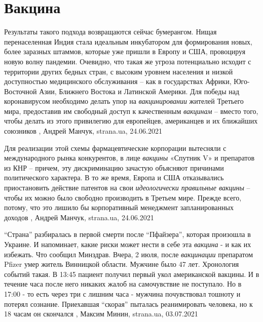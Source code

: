  
 
 
 
 
\chapter{Вакцина}
\label{sec:slova.vaccina}

Результаты такого подхода возвращаются сейчас бумерангом. Нищая перенаселенная
Индия стала идеальным инкубатором для формирования новых, более заразных
штаммов, которые уже пришли в Европу и США, провоцируя новую волну пандемии.
Очевидно, что такая же угроза потенциально исходит с территории других бедных
стран, с высоким уровнем населения и низкой доступностью медицинского
обслуживания – как в государствах Африки, Юго-Восточной Азии, Ближнего Востока
и Латинской Америки. Для победы над коронавирусом необходимо делать упор на
\emph{вакцинировании} жителей Третьего мира, предоставив им свободный доступ к
качественным \emph{вакцинам} – вместо того, чтобы делать из этого привилегию для
европейцев, американцев и их ближайших союзников
, 
Андрей Манчук, strana.ua, 24.06.2021

Для реализации этой схемы фармацевтические корпорации вытесняли с
международного рынка конкурентов, в лице \emph{вакцины} «Спутник V» и препаратов из
КНР – причем, эту дискриминацию зачастую объясняют причинами политического
характера. В то же время, Европа и США отказывались приостановить действие
патентов на свои \emph{идеологически правильные вакцины} – чтобы их можно было
свободно производить в Третьем мире. Прежде всего, потому, что это лишило бы
корпоративный менеджмент запланированных доходов
, 
Андрей Манчук, strana.ua, 24.06.2021

\enquote{Страна} разбиралась в первой смерти после \enquote{Пфайзера}, которая
произошла в Украине. И напоминает, какие риски может нести в себе эта
\emph{вакцина} - и как их избежать.  Что сообщил Минздрав.  Вчера, 2 июля,
после \emph{вакцинации} препаратом Pfizer умер житель Винницкой области.
Мужчине было 47 лет.  Хронология событий такая. В 13:45 пациент получил первый
укол американской вакцины. И в течение часа после него никаких жалоб на
самочувствие не поступало.  Но в 17:00 - то есть через три с лишним часа -
мужчина почувствовал тошноту и потерял сознание. Приехавшая \enquote{скорая}
пыталась реанимировать человека, но к 18 часам он скончался
, 
Максим Минин, strana.ua, 03.07.2021

